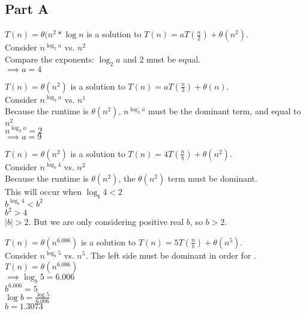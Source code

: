 \documentclass[12pt,twoside]{article}
\begin{document}

\begin{problems}

\section*{Part A}

\problem  %

\begin{problemparts}
\problempart $T(n) = \theta(n^2*\log n$ is a solution to $T(n) = aT(\frac{n}{2}) + \theta(n^2)$. \\
Consider $n^{\log_2 a}$ vs. $n^2$ \\
Compare the exponents: $\log_2 a$ and $2$ must be equal. \\
$\implies a=4$

\bigskip


\problempart $T(n) = \theta(n^2)$ is a solution to $T(n) = aT(\frac{n}{3}) + \theta(n)$. \\
Consider $n^{\log_3 a}$ vs. $n^1$ \\
Because the runtime is $\theta(n^2)$, $n^{\log_3 a}$ must be the dominant term, and equal to $n^2$ \\
$n^{\log_3 a} = 2$ \\
$\implies a=9$

\bigskip

\problempart $T(n) = \theta(n^2)$ is a solution to $T(n) = 4T(\frac{n}{b}) + \theta(n^2)$. \\
Consider $n^{\log_b 4}$ vs. $n^2$ \\
Because the runtime is $\theta(n^2)$, the $\theta(n^2)$ term must be dominant. \\
This will occur when $\log_b 4 < 2$ \\
$b^{\log_b 4} < b^2$ \\
$b^2 > 4$ \\
$|b| > 2$. But we are only considering positive real $b$, so $b>2$.

\bigskip

\problempart $T(n) = \theta(n^{6.006})$ is a solution to $T(n) = 5T(\frac{n}{b}) + \theta(n^5)$. \\
Consider $n^{\log_b 5}$ vs. $n^5$. The left side must be dominant in order for .$T(n) = \theta(n^{6.006})$ \\
$\implies \log_b 5 = 6.006$\\
$b^{6.006} = 5$ \\
$\log b = \frac{\log 5}{6.006} $\\
$b = 1.3073$


\end{problemparts}
\end{problems}
\end{document}
